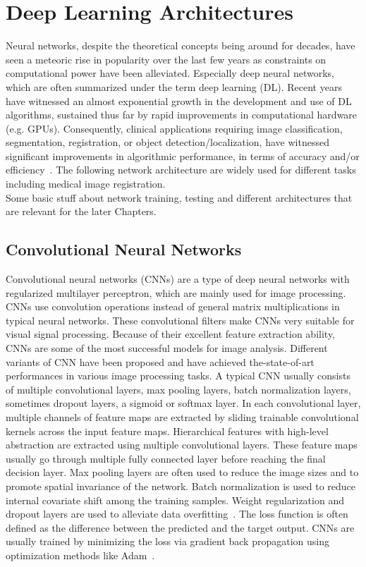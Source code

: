 \documentclass[english,version-2022-01]{uzl-thesis} %
\begin{document}
\section{Deep Learning Architectures}
Neural networks, despite the theoretical concepts being around for decades, have seen a meteoric rise in popularity over the last few years as constraints on computational power have been alleviated. Especially deep neural networks, which are often summarized under the term deep learning (DL). Recent years have witnessed an almost exponential growth in the development and use of DL algorithms, sustained thus far by rapid improvements in computational hardware (e.g. GPUs). Consequently, clinical applications requiring image classification, segmentation, registration, or object detection/localization, have witnessed significant improvements in algorithmic performance, in terms of accuracy and/or efficiency~\cite{Chen2020}. The following network architecture are widely used for different tasks including medical image registration. \\
Some basic stuff about network training, testing and different architectures that are relevant for the later Chapters.

\subsection{Convolutional Neural Networks}
Convolutional neural networks (CNNs) are a type of deep neural networks with regularized multilayer perceptron, which are mainly used for image processing. CNNs use convolution operations instead of general matrix multiplications in typical neural networks. These convolutional filters make CNNs very suitable for visual signal processing. Because of their excellent feature extraction ability, CNNs are some of the most successful models for image analysis. Different variants of CNN have been proposed and have achieved the-state-of-art performances in various image processing tasks. A typical CNN usually consists of multiple convolutional layers, max pooling layers, batch normalization layers, sometimes dropout layers, a sigmoid or softmax layer. In each convolutional layer, multiple channels of feature maps are extracted by sliding trainable convolutional kernels across the input feature maps. Hierarchical features with high-level abstraction are extracted using multiple convolutional layers. These feature maps usually go through multiple fully connected layer before reaching the final decision layer. Max pooling layers are often used to reduce the image sizes and to promote spatial invariance of the network. Batch normalization is used to reduce internal covariate shift among the training samples. Weight regularization and dropout layers are used to alleviate data overfitting~\cite{Fu2020}. The loss function is often defined as the difference between the predicted and the target output. CNNs are usually trained by minimizing the loss via gradient back propagation using optimization methods like Adam~\cite{Adam}. 
\end{document}
